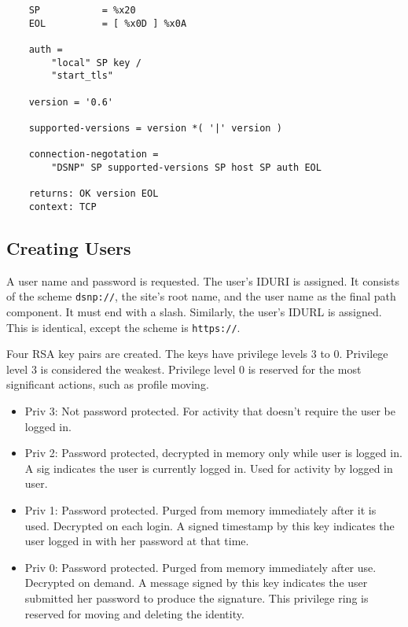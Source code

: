 \documentclass[letterpaper,11pt,oneside]{article}
\begin{document}
\vspace{10pt}
\begin{verbatim}
    SP           = %x20
    EOL          = [ %x0D ] %x0A

    auth = 
        "local" SP key /
        "start_tls"

    version = '0.6'

    supported-versions = version *( '|' version )

    connection-negotation = 
        "DSNP" SP supported-versions SP host SP auth EOL

    returns: OK version EOL
    context: TCP
\end{verbatim}

\subsection{Creating Users}

A user name and password is requested. The user's IDURI is assigned. It
consists of the scheme \verb'dsnp://', the site's root name, and the user name
as the final path component. It must end with a slash. Similarly, the user's
IDURL is assigned. This is identical, except the scheme is \verb'https://'.

%
%

Four RSA key pairs are created. The keys have privilege levels 3 to 0.
Privilege level 3 is considered the weakest. Privilege level 0 is reserved for
the most significant actions, such as profile moving.

\begin{itemize}
\item Priv 3: Not password protected. For activity that doesn't require the user be logged
in.

\item Priv 2: Password protected, decrypted in memory only while user is logged
in. A sig indicates the user is currently logged in. Used for activity by
logged in user.

\item Priv 1: Password protected. Purged from memory immediately after it is
used. Decrypted on each login. A signed timestamp by this key indicates the
user logged in with her password at that time.

\item Priv 0: Password protected. Purged from memory immediately after use.
Decrypted on demand. A message signed by this key indicates the user submitted
her password to produce the signature. This privilege ring is reserved for
moving and deleting the identity.
\end{itemize}
\end{document}
